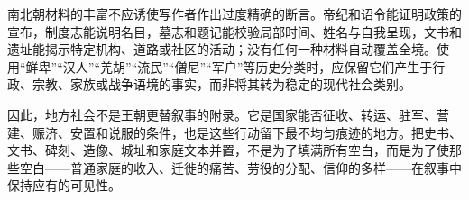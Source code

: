 南北朝材料的丰富不应诱使写作者作出过度精确的断言。帝纪和诏令能证明政策的宣布，制度志能说明名目，墓志和题记能校验局部时间、姓名与自我呈现，文书和遗址能揭示特定机构、道路或社区的活动；没有任何一种材料自动覆盖全境。使用“鲜卑”“汉人”“羌胡”“流民”“僧尼”“军户”等历史分类时，应保留它们产生于行政、宗教、家族或战争语境的事实，而非将其转为稳定的现代社会类别。

因此，地方社会不是王朝更替叙事的附录。它是国家能否征收、转运、驻军、营建、赈济、安置和说服的条件，也是这些行动留下最不均匀痕迹的地方。把史书、文书、碑刻、造像、城址和家庭文本并置，不是为了填满所有空白，而是为了使那些空白——普通家庭的收入、迁徙的痛苦、劳役的分配、信仰的多样——在叙事中保持应有的可见性。
